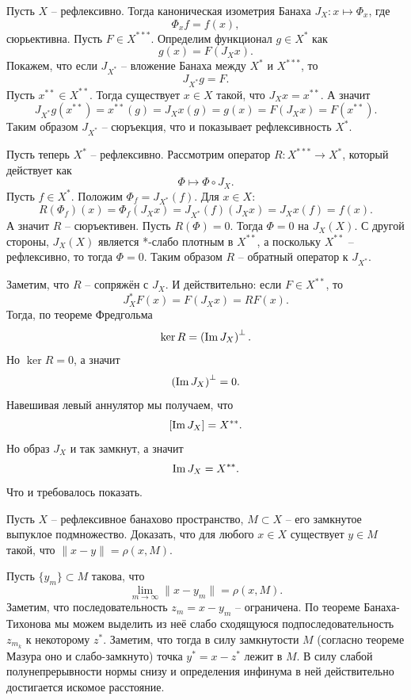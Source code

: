 \begin{solution}
    Пусть $X$ -- рефлексивно.
    Тогда каноническая изометрия Банаха $J_X\colon x \mapsto \Phi_x$, где
    \[
        \Phi_x f = f(x),
    \]
    сюрьективна.
    Пусть $F \in X^{***}$.
    Определим функционал $g \in X^*$ как
    \[
        g(x) = F\left(J_X x\right).
    \]
    Покажем, что если $J_{X^*}$ -- вложение Банаха между $X^*$ и $X^{***}$, то
    \[
        J_{X^*}g = F.
    \]
    Пусть $x^{**} \in X^{**}$.
    Тогда существует $x \in X$ такой, что $J_X x = x^{**}$.
    А значит
    \[
        J_{X^*}g(x^{**}) = x^{**}(g) = J_X x (g) = g(x) = F(J_X x) = F(x^{**}).
    \]
    Таким образом $J_{X^*}$ -- сюръекция, что и показывает рефлексивность $X^*$.

    Пусть теперь $X^*$ -- рефлексивно.
    Рассмотрим оператор $R\colon X^{***} \to X^*$, который действует как
    \[
        \Phi \mapsto \Phi \circ J_X.
    \]
    Пусть $f \in X^*$.
    Положим $\Phi_f = J_{X^*}(f)$.
    Для $x \in X\colon$
    \[
        R(\Phi_f)(x) = \Phi_f(J_X x) = J_{X^*}(f)(J_X x) = J_X x(f) = f(x).
    \]
    А значит $R$ -- сюръективен.
    Пусть $R(\Phi) = 0$.
    Тогда $\Phi = 0$ на $J_X(X)$.
    С другой стороны, $J_X(X)$ является *-слабо плотным в $X^{**}$, а поскольку $X^{**}$ -- рефлексивно, то тогда $\Phi = 0$.
    Таким образом $R$ -- обратный оператор к $J_{X^*}$.

    Заметим, что $R$ -- сопряжён с $J_X$.
    И действительно: если $F \in X^{**}$, то
    \[
        J_X^* F(x) = F(J_X x) = RF(x).
    \]
    Тогда, по теореме Фредгольма
    \[
        \ker R = \left(\operatorname{Im} J_X\right)^{\perp}.
    \]
    Но $\ker R = 0$, а значит
    \[
        \left(\operatorname{Im} J_X\right)^{\perp} = 0.
    \]
    Навешивая левый аннулятор мы получаем, что
    \[
        [\operatorname{Im} J_X] = X^{**}.
    \]
    Но образ $J_X$ и так замкнут, а значит
    \[
        \operatorname{Im} J_X = X^{**}.
    \]
    Что и требовалось показать.
\end{solution}
\begin{task}[T13]
    Пусть $X$ -- рефлексивное банахово пространство, $M \subset X$ -- его замкнутое выпуклое подмножество.
    Доказать, что для любого $x \in X$ существует $y \in M$ такой, что $\|x - y \| = \rho(x, M)$.
\end{task}
\begin{solution}
    Пусть $\{y_m\} \subset M$ такова, что
    \[
        \lim_{m \rightarrow \infty} \|x - y_m\| = \rho(x, M).
    \]
    Заметим, что последовательность $z_m = x - y_m$ -- ограничена.
    По теореме Банаха-Тихонова мы можем выделить из неё слабо сходящуюся подпоследовательность $z_{m_k}$ к некоторому $z^*$.
    Заметим, что тогда в силу замкнутости $M$ (согласно теореме Мазура оно и слабо-замкнуто) точка $y^* = x - z^*$ лежит в $M$.
    В силу слабой полунепрерывности нормы снизу и определения инфинума в ней действительно достигается искомое расстояние.
\end{solution}
